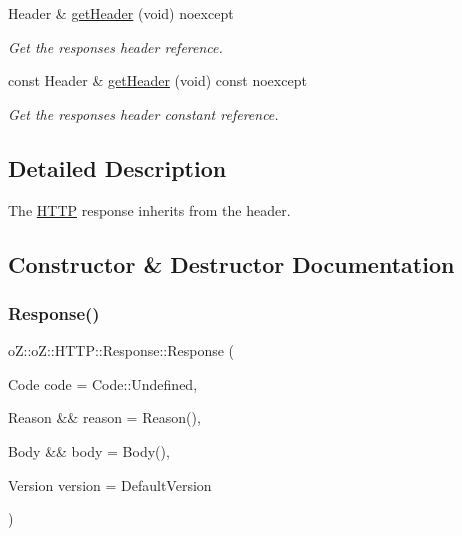\begin{DoxyCompactItemize}
Header \& \mbox{\hyperlink{classo_z_1_1o_z_1_1_h_t_t_p_1_1_response_a38279a872d9c2c731fc43493995afabe}{get\+Header}} (void) noexcept
\begin{DoxyCompactList}\small\item\em Get the response\textquotesingle{}s header reference. \end{DoxyCompactList}\item 
const Header \& \mbox{\hyperlink{classo_z_1_1o_z_1_1_h_t_t_p_1_1_response_a231a5ff9942da0165e02aa718baf2e75}{get\+Header}} (void) const noexcept
\begin{DoxyCompactList}\small\item\em Get the response\textquotesingle{}s header constant reference. \end{DoxyCompactList}\end{DoxyCompactItemize}


\subsection{Detailed Description}
The \mbox{\hyperlink{namespaceo_z_1_1o_z_1_1_h_t_t_p}{H\+T\+TP}} response inherits from the header. 

\subsection{Constructor \& Destructor Documentation}
\mbox{\label{classo_z_1_1o_z_1_1_h_t_t_p_1_1_response_aa5b5d0b822053603c5fde6e301e1ca67}} 
\subsubsection{\texorpdfstring{Response()}{Response()}\hspace{0.1cm}{\footnotesize\ttfamily [1/3]}}
{\footnotesize\ttfamily o\+Z\+::o\+Z\+::\+H\+T\+T\+P\+::\+Response\+::\+Response (\begin{DoxyParamCaption}\item[{Code}]{code = {\ttfamily Code\+:\+:Undefined},  }\item[{Reason \&\&}]{reason = {\ttfamily Reason()},  }\item[{Body \&\&}]{body = {\ttfamily Body()},  }\item[{Version}]{version = {\ttfamily DefaultVersion} }\end{DoxyParamCaption})\hspace{0.3cm}{\ttfamily [inline]}}



